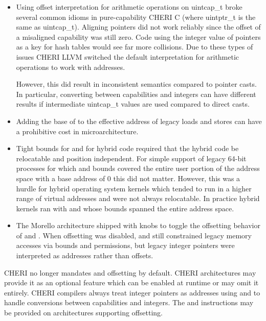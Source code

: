 \begin{itemize}
\item Using offset interpretation for arithmetic operations on
  uintcap\_t broke several common idioms in pure-capability CHERI C
  (where uintptr\_t is the same as uintcap\_t).  Aligning pointers did
  not work reliably since the offset of a misaligned capability was
  still zero.  Code using the integer value of pointers as a key for
  hash tables would see far more collisions.  Due to these types of
  issues CHERI LLVM switched the default interpretation for arithmetic
  operations to work with addresses.

  However, this did result in inconsistent semantics compared to
  pointer casts.  In particular, converting between capabilities and
  integers can have different results if intermediate uintcap\_t
  values are used compared to direct casts.

\item Adding the base of \DDC{} to the effective address of legacy
  loads and stores can have a prohibitive cost in microarchitecture.

\item Tight bounds for \DDC{} and \PCC{} for hybrid code required that
  the hybrid code be relocatable and position independent.  For simple
  support of legacy 64-bit processes for which \DDC{} and \PCC{}
  bounds covered the entire user portion of the address space with a
  base address of 0 this did not matter.  However, this was a hurdle
  for hybrid operating system kernels which tended to run in a higher
  range of virtual addresses and were not always relocatable.  In
  practice hybrid kernels ran with \DDC{} and \PCC{} whose bounds
  spanned the entire address space.

\item The Morello architecture shipped with knobs to toggle the
  offsetting behavior of \DDC{} and \PCC{}.  When offsetting was
  disabled, \DDC{} and \PCC{} still constrained legacy memory accesses
  via bounds and permissions, but legacy integer pointers were
  interpreted as addresses rather than offsets.
\end{itemize}

CHERI no longer mandates \DDC{} and \PCC{} offsetting by default.
CHERI architectures may provide it as an optional feature which can be
enabled at runtime or may omit it entirely.  CHERI compilers always
treat integer pointers as addresses using  and
 to handle conversions between capabilities and
integers.  The  and  instructions
may be provided on architectures supporting offsetting.

